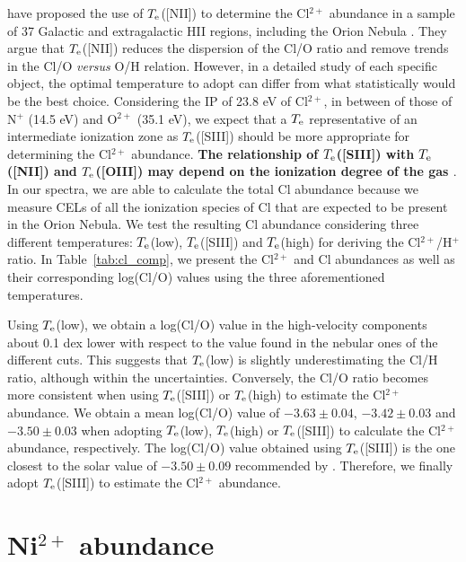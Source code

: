 \documentclass[fleqn,usenatbib]{mnras}
\begin{document}
\citet{dominguezguzman19} have proposed the use of $T_{\rm e}$([N\thinspace II]) to determine the Cl$^{2+}$ abundance in a sample of 37  Galactic and extragalactic H\thinspace II regions, including the Orion Nebula \citep[using the data of][]{Esteban04}. They argue that $T_{\rm e}$([N\thinspace II]) reduces the dispersion of the Cl/O ratio and remove trends in the Cl/O {\it versus} O/H relation. However, in a detailed study of each specific object, the optimal temperature to adopt can differ from what statistically would be the best choice. 
Considering the IP of 23.8 eV of Cl$^{2+}$, in between of those of N$^+$ (14.5 eV) and O$^{2+}$ (35.1 eV), we expect that a $T_{\rm e}$ representative of an intermediate ionization zone as $T_{\rm e}$([S\thinspace III]) should be more appropriate for determining the Cl$^{2+}$ abundance. {\bf The relationship of $T_{\rm e}$([S\thinspace III]) with $T_{\rm e}$([N\thinspace II]) and $T_{\rm e}$([O\thinspace III]) may depend on the ionization degree of the gas \citep{Berg20}}. In our spectra, we are able to calculate the total Cl abundance because we measure CELs of all the ionization species of Cl that are expected to be present in the Orion Nebula. We test the resulting Cl abundance considering three different temperatures: $T_{\rm e}$(low), $T_{\rm e}$([S\thinspace III]) and $T_{\rm e}$(high) for deriving the Cl$^{2+}$/H$^+$ ratio. In Table~\ref{tab:cl_comp}, we present the Cl$^{2+}$ and Cl abundances as well as their corresponding log(Cl/O) values using the three aforementioned temperatures.

Using $T_{\rm e}$(low), we obtain a log(Cl/O) value in the high-velocity components about 0.1 dex lower with respect to the value found in the nebular ones of the different cuts. This  suggests that $T_{\rm e}$(low) is slightly underestimating the Cl/H ratio, although within the uncertainties. Conversely, the Cl/O ratio becomes more consistent when using $T_{\rm e}$([S\thinspace III]) or $T_{\rm e}$(high) to estimate the Cl$^{2+}$ abundance. We obtain a mean log(Cl/O) value of $-3.63 \pm 0.04$, $-3.42 \pm 0.03$ and $-3.50 \pm 0.03$ when adopting $T_{\rm e}$(low), $T_{\rm e}$(high) or $T_{\rm e}$([S\thinspace III]) to calculate the Cl$^{2+}$ abundance, respectively. The log(Cl/O) value obtained using $T_{\rm e}$([S\thinspace III]) is the one closest to the solar value of $-3.50 \pm 0.09$ recommended by \citet{lodders19}. Therefore, we finally adopt $T_{\rm e}$([S\thinspace III]) to estimate the Cl$^{2+}$ abundance.

\section{Ni$^{2+}$ abundance}
\label{sec:ni2_ab_comment}
\end{document}
